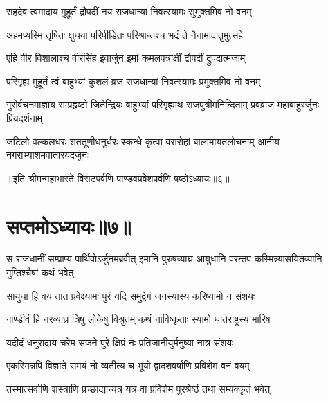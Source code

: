 


\twolineshloka
{सहदेव त्वमादाय मुहूर्तं द्रौपदीं नय}
{राजधान्यां निवत्स्यामः सुमुक्तमिव नो वनम्}




\twolineshloka
{अहमप्यस्मि तृषितः क्षुधया परिपीडितः}
{परिश्रान्तश्च भद्रं ते नैनामादातुमुत्सहे}




\twolineshloka
{एहि वीर विशालाश्च वीरसिंह इवार्जुन}
{इमां कमलपत्राक्षीं द्रौपदीं द्रुपदात्मजाम्}


\twolineshloka
{परिगृह्य मुहूर्तं त्वं बाहुभ्यां कुशलं व्रज}
{राजधान्यां निवत्स्यामः प्रमुक्तमिव नो वनम्}



\threelineshloka
{गुरोर्वचनमाज्ञाय सम्प्रहृष्टो जितेन्द्रियः}
{बाहुभ्यां परिगृह्याथ राजपुत्रीमनिन्दिताम्}
{प्रवव्राज महाबाहुरर्जुनः प्रियदर्शनाम्}


\threelineshloka
{जटिलो वल्कलधरः शततूणीधनुर्धरः}
{स्कन्धे कृत्वा वरारोहां बालामायतलोचनाम्}
{आनीय नगराभ्याशमवातारयदर्जुनः}


॥इति श्रीमन्महाभारते विराटपर्वणि पाण्डवप्रवेशपर्वणि षष्ठोऽध्यायः॥६॥

\chapter{सप्तमोऽध्यायः॥७॥}

\threelineshloka
{स राजधानीं सम्प्राप्य पार्थिवोऽर्जुनमब्रवीत्}
{इमानि पुरुषव्याघ्र आयुधानि परन्तप}
{कस्मिन्न्यासयितव्यानि गुप्तिश्चैषां कथं भवेत्}


\twolineshloka
{सायुधा हि वयं तात प्रवेक्ष्यामः पुरं यदि}
{समुद्वेगं जनस्यास्य करिष्यामो न संशयः}


\twolineshloka
{गाण्डीवं हि नरव्याघ्र त्रिषु लोकेषु विश्रुतम्}
{कथं नाविष्कृताः स्यामो धार्तराष्ट्रस्य मारिष}


\twolineshloka
{यदीदं धनुरादाय चरेम सजने पुरे}
{क्षिप्रं नः प्रतिजानीयुर्मनुष्या नात्र संशयः}


\twolineshloka
{एकस्मिन्नपि विज्ञाते समयं नो व्यतीत्य च}
{भूयो द्वादशवर्षाणि प्रविशेम वनं वयम्}


\twolineshloka
{तस्मात्सर्वाणि शस्त्राणि प्रच्छाद्यान्यत्र यत्र वा}
{प्रविशेम पुरश्रेष्ठं तथा सम्यक्कृतं भवेत्}



